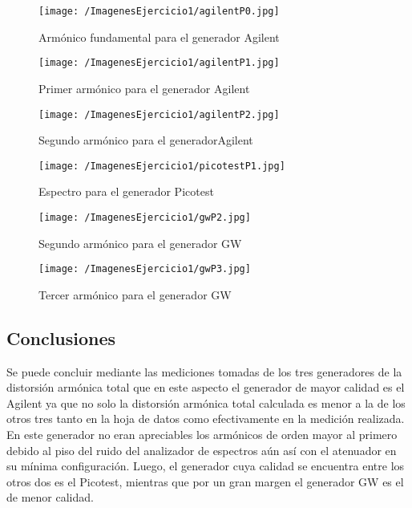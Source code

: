 \begin{figure}[H]
  \centering
  \begin{minipage}[b]{0.4\textwidth}
    \texttt{[image: /ImagenesEjercicio1/agilentP0.jpg]}
    \caption{Armónico fundamental para el generador Agilent}
    \label{fig:ag1}
  \end{minipage}
  \hfill
  \begin{minipage}[b]{0.4\textwidth}
    \texttt{[image: /ImagenesEjercicio1/agilentP1.jpg]}
    \caption{Primer armónico para el generador Agilent}
    \label{fig:ag2}
  \end{minipage}
   \hfill
   \begin{minipage}[b]{0.4\textwidth}
    \texttt{[image: /ImagenesEjercicio1/agilentP2.jpg]}
    \caption{Segundo armónico para el generadorAgilent}
    \label{fig:ag3}
  \end{minipage}
\end{figure}

\begin{figure}[H]
	\centering
	\texttt{[image: /ImagenesEjercicio1/picotestP1.jpg]}
\caption{Espectro para el generador Picotest}
	\label{fig:pico1}
\end{figure}

\begin{figure}[H]
  \centering
  \begin{minipage}[b]{0.4\textwidth}
    \texttt{[image: /ImagenesEjercicio1/gwP2.jpg]}
    \caption{Segundo armónico para el generador GW}
    \label{fig:gw0}
  \end{minipage}
  \hfill
  \begin{minipage}[b]{0.4\textwidth}
    \texttt{[image: /ImagenesEjercicio1/gwP3.jpg]}
    \caption{Tercer armónico para el generador GW}
    \label{fig:gw1}
  \end{minipage}
 \end{figure}

\subsection{Conclusiones}
Se puede concluir mediante las mediciones tomadas de los tres generadores de la distorsión armónica total que en este aspecto el generador de mayor calidad es el Agilent ya que no solo la distorsión armónica total calculada es menor a la de los otros tres tanto en la hoja de datos como efectivamente en la medición realizada. En este generador no eran apreciables los armónicos de orden mayor al primero debido al piso del ruido del analizador de espectros aún así con el atenuador en su mínima configuración. Luego, el generador cuya calidad se encuentra entre los otros dos es el Picotest, mientras que por un gran margen el generador GW es el de menor calidad.    
